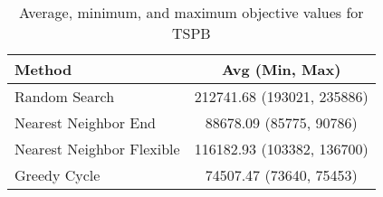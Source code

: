 \begin{table}[h!]
\centering
\begin{tabular}{lc}
\hline
Method & Avg (Min, Max) \\
\hline
Random Search & 212741.68 (193021, 235886) \\
Nearest Neighbor End & 88678.09 (85775, 90786) \\
Nearest Neighbor Flexible & 116182.93 (103382, 136700) \\
Greedy Cycle & 74507.47 (73640, 75453) \\
\hline
\end{tabular}
\caption{Average, minimum, and maximum objective values for TSPB}
\label{tab:TSPB_results}
\end{table}
